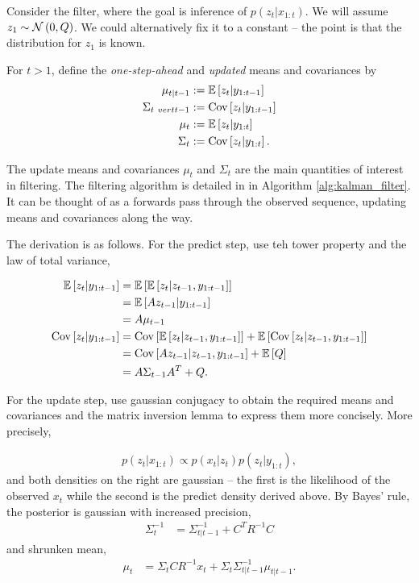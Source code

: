 \documentclass[14pt]{extreport}
\begin{document}
Consider the filter, where the goal is inference of $p\left(z_{t} \vert
x_{1:t}\right)$. We will assume $z_{1} \sim \mathcal{N}\left(0, Q\right)$. We
could alternatively fix it to a constant -- the point is that the distribution
for $z_{1}$ is known.

For $t > 1$, define the \textit{one-step-ahead} and \textit{updated} means and
covariances by
\begin{align*}
  \mu_{t \vert t - 1} &:= \mathbb{E}\left[{z_{t} \vert y_{1:t - 1}}\right] \\
  \Sigma_{t \ vert t - 1} &:= \mathrm{Cov}\left[{z_{t} \vert y_{1:t - 1}}\right] \\
  \mu_{t} &:= \mathbb{E}\left[{z_{t} \vert y_{1:t}}\right] \\
  \Sigma_{t} &:= \mathrm{Cov}\left[{z_{t} \vert y_{1:t}}\right].
\end{align*}

The update means and covariances $\mu_{t}$ and $\Sigma_{t}$ are the main
quantities of interest in filtering. The filtering algorithm is detailed in in
Algorithm \ref{alg:kalman_filter}. It can be thought of as a forwards pass
through the observed sequence, updating means and covariances along the way.

The derivation is as follows. For the predict step, use teh tower property and
the law of total variance,

\begin{align*}
  \mathbb{E}\left[{z_{t} \vert y_{1:t - 1}}\right] &= \mathbb{E}\left[{\mathbb{E}\left[{z_{t} \vert z_{t - 1}, y_{1:t - 1}}\right]}\right] \\
  & = \mathbb{E}\left[{Az_{t - 1}\vert y_{1:t - 1}}\right] \\
  &= A\mu_{t - 1} \\
  \mathrm{Cov}\left[{z_{t} \vert y_{1:t - 1}}\right] &= \mathrm{Cov}\left[{\mathbb{E}\left[{z_{t} \vert z_{t - 1}, y_{1:t - 1}}\right]}\right] + \mathbb{E}\left[{\mathrm{Cov}\left[{z_{t} \vert z_{t - 1}, y_{1:t - 1}}\right]}\right] \\
  &= \mathrm{Cov}\left[{Az_{t - 1} \vert z_{t - 1}, y_{1:t - 1}}\right] + \mathbb{E}\left[{Q}\right] \\
  &= A\Sigma_{t - 1}A^{T} + Q.
\end{align*}

For the update step, use gaussian conjugacy to obtain the required means and
covariances and the matrix inversion lemma to express them more concisely.
More precisely,

\begin{align*}
p\left(z_{t} \vert x_{1:t}\right) \propto p\left(x_{t} \vert z_{t}\right)p\left(z_{t} \vert y_{1:t}\right),
\end{align*}
and both densities on the right are gaussian -- the first is the likelihood of
the observed $x_{t}$ while the second is the predict density derived above. By
Bayes' rule, the posterior is gaussian with increased precision,
\begin{align}
  \label{eq:sigma_t_inv}
\Sigma_{t}^{-1} &= \Sigma_{t \vert t - 1}^{-1} + C^{T}R^{-1}C
\end{align}
and shrunken mean,
\begin{align}
  \label{eq:mu_t}
\mu_{t} &= \Sigma_{t}CR^{-1}x_{t} + \Sigma_{t}\Sigma_{t \vert t - 1}^{-1} \mu_{t \vert t - 1}.
\end{align}
\end{document}
